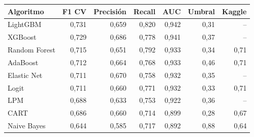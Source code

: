 
\begin{tabular}{lrrrrrr}
\toprule
Algoritmo & F1 CV & Precisión & Recall & AUC & Umbral & Kaggle\\
\midrule
LightGBM & 0,731 & 0,659 & 0,820 & 0,942 & 0,31 & --\\
XGBoost & 0,729 & 0,686 & 0,778 & 0,941 & 0,37 & --\\
Random Forest & 0,715 & 0,651 & 0,792 & 0,933 & 0,34 & 0,71\\
AdaBoost & 0,712 & 0,664 & 0,768 & 0,933 & 0,46 & 0,71\\
Elastic Net & 0,711 & 0,670 & 0,758 & 0,932 & 0,35 & --\\
Logit & 0,711 & 0,660 & 0,771 & 0,932 & 0,33 & 0,71\\
LPM & 0,688 & 0,633 & 0,753 & 0,922 & 0,36 & --\\
CART & 0,686 & 0,660 & 0,714 & 0,899 & 0,28 & 0,67\\
Naive Bayes & 0,644 & 0,585 & 0,717 & 0,892 & 0,88 & 0,64\\
\bottomrule
\end{tabular}
